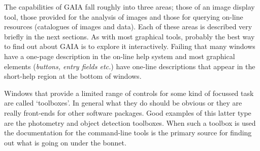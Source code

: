 \documentclass[twoside,11pt]{article}
\renewcommand{\_}{\texttt{\symbol{95}}}
\begin{document}
The capabilities of GAIA fall roughly into three areas; those of an
image display tool, those provided for the analysis of images and
those for querying on-line resources (catalogues of images and
data). Each of these areas is described very briefly in the next
sections. As with most graphical tools, probably the best way to find
out about GAIA is to explore it interactively. Failing that many
windows have a one-page description in the on-line help system and
most graphical elements (\textit{buttons, entry fields etc.}) have
one-line descriptions that appear in the short-help region at the
bottom of windows.

Windows that provide a limited range of controls for some kind of
focussed task are called `toolboxes'. In general what they do should
be obvious or they are really front-ends for other software
packages. Good examples of this latter type are the photometry and
object detection toolboxes. When such a toolbox is used the
documentation for the command-line tools is the primary source for
finding out what is going on under the bonnet.
\end{document}
